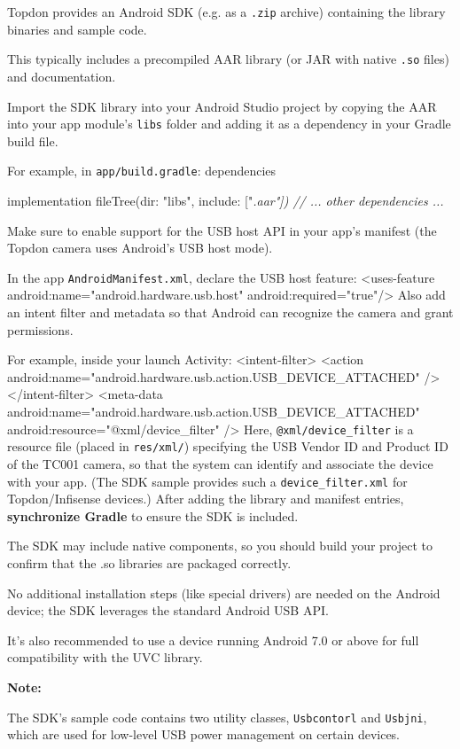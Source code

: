 Topdon provides an Android SDK (e.g.  as a \texttt{.zip} archive) containing the
library binaries and sample code.

This typically includes a precompiled AAR library (or JAR with native \texttt{.so}
files) and documentation.

Import the SDK library into your Android Studio project by copying the AAR into your
app module's \texttt{libs} folder and adding it as a dependency in your Gradle build
file.

For example, in \texttt{app/build.gradle}: dependencies { implementation
fileTree(dir: "libs", include: ["\textit{.aar"]) // ...  other dependencies ...  }

Make sure to enable support for the USB host API in your app's manifest (the Topdon
camera uses Android's USB host mode).

In the app \texttt{AndroidManifest.xml}, declare the USB host feature: <uses-feature
android:name="android.hardware.usb.host" android:required="true"/> Also add an intent
filter and metadata so that Android can recognize the camera and grant permissions.

For example, inside your launch Activity: <intent-filter> <action
android:name="android.hardware.usb.action.USB_DEVICE_ATTACHED" /> </intent-filter>
<meta-data android:name="android.hardware.usb.action.USB_DEVICE_ATTACHED"
android:resource="@xml/device_filter" /> Here, \texttt{@xml/device_filter} is a
resource file (placed in \texttt{res/xml/}) specifying the USB Vendor ID and Product
ID of the TC001 camera, so that the system can identify and associate the device with
your app.  (The SDK sample provides such a \texttt{device_filter.xml} for
Topdon/Infisense devices.) After adding the library and manifest entries,
\textbf{synchronize Gradle}
 to ensure the SDK is included.

The SDK may include native components, so you should build your project to confirm
that the .so libraries are packaged correctly.

No additional installation steps (like special drivers) are needed on the Android
device; the SDK leverages the standard Android USB API.

It's also recommended to use a device running Android 7.0 or above for full
compatibility with the UVC library.

\textbf{Note:}

The SDK's sample code contains two utility classes, \texttt{Usbcontorl} and
\texttt{Usbjni}, which are used for low-level USB power management on certain
devices.

}
